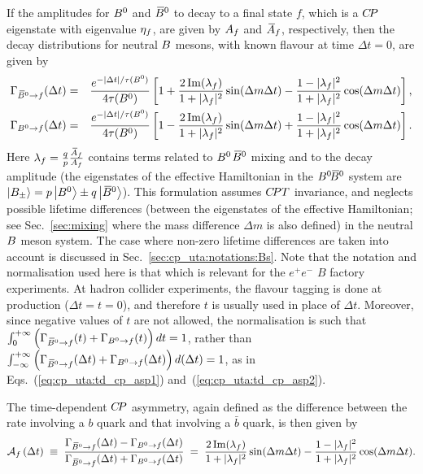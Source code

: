 If the amplitudes for $B^0$ and $\kern 0.18em\overline{\kern -0.18em B}{}^0$ to decay to a final state $f$, 
which is a $C\!P$ eigenstate with eigenvalue ${\eta_f}$,
are given by $A_f$ and $\kern 0.18em\overline{\kern -0.18em A}{}_f$, respectively, 
then the decay distributions for neutral $B$ mesons, 
with known flavour at time $\Delta t =0$,
are given by
\begin{eqnarray}
  \label{eq:cp_uta:td_cp_asp1}
  \Gamma_{\kern 0.18em\overline{\kern -0.18em B}{}^0 \to f} (\Delta t) & = &
  \frac{e^{-| \Delta t | / \tau(B^0)}}{4\tau(B^0)}
  \left[ 
    1 +
    \frac{2\, {\rm Im}(\lambda_f)}{1 + |\lambda_f|^2} \sin(\Delta m \Delta t) -
    \frac{1 - |\lambda_f|^2}{1 + |\lambda_f|^2} \cos(\Delta m \Delta t)
  \right], \\
  \label{eq:cp_uta:td_cp_asp2}
  \Gamma_{B^0 \to f} (\Delta t) & = &
  \frac{e^{-| \Delta t | / \tau(B^0)}}{4\tau(B^0)}
  \left[ 
    1 -
    \frac{2\, {\rm Im}(\lambda_f)}{1 + |\lambda_f|^2} \sin(\Delta m \Delta t) +
    \frac{1 - |\lambda_f|^2}{1 + |\lambda_f|^2} \cos(\Delta m \Delta t)
  \right].
\end{eqnarray}
Here $\lambda_f = \frac{q}{p} \frac{\kern 0.18em\overline{\kern -0.18em A}{}_f}{A_f}$ 
contains terms related to $B^0$\textendash$\kern 0.18em\overline{\kern -0.18em B}{}^0$ mixing and to the decay amplitude
(the eigenstates of the effective Hamiltonian in the $\BzBzb$ system 
are $\left| B_\pm \right> = p \left| B^0 \right> \pm q \left| \kern 0.18em\overline{\kern -0.18em B}{}^0 \right>$).
This formulation assumes $C\!PT$ invariance, 
and neglects possible lifetime differences 
(between the eigenstates of the effective Hamiltonian;
see Sec.~\ref{sec:mixing} where the mass difference $\Delta m$ is also defined)
in the neutral $B$ meson system.
The case where non-zero lifetime differences are taken into account is 
discussed in Sec.~\ref{sec:cp_uta:notations:Bs}.
Note that the notation and normalisation used here is that which is relevant for the $e^+e^-$ $B$ factory experiments.
At hadron collider experiments, the flavour tagging is done at production ($\Delta t = t = 0$), and therefore $t$ is usually used in place of $\Delta t$.
Moreover, since negative values of $t$ are not allowed, the normalisation is such that 
$\int_0^{+\infty} \left( 
\Gamma_{\kern 0.18em\overline{\kern -0.18em B}{}^0 \to f} (t) + \Gamma_{B^0 \to f} (t) \right) dt = 1$,
rather than 
$\int_{-\infty}^{+\infty} \left( 
\Gamma_{\kern 0.18em\overline{\kern -0.18em B}{}^0 \to f} (\Delta t) + \Gamma_{B^0 \to f} (\Delta t) \right) d(\Delta t) = 1$,
as in Eqs.~(\ref{eq:cp_uta:td_cp_asp1}) and~(\ref{eq:cp_uta:td_cp_asp2}).

The time-dependent $C\!P$ asymmetry,
again defined as the difference between the rate 
involving a $b$ quark and that involving a $\bar b$ quark,
is then given by
\begin{equation}
  \label{eq:cp_uta:td_cp_asp}
  {\cal A}_{f} \left(\Delta t\right) \; \equiv \;
  \frac{
    \Gamma_{\kern 0.18em\overline{\kern -0.18em B}{}^0 \to f} (\Delta t) - \Gamma_{B^0 \to f} (\Delta t)
  }{
    \Gamma_{\kern 0.18em\overline{\kern -0.18em B}{}^0 \to f} (\Delta t) + \Gamma_{B^0 \to f} (\Delta t)
  } \; = \;
  \frac{2\, {\rm Im}(\lambda_f)}{1 + |\lambda_f|^2} \sin(\Delta m \Delta t) -
  \frac{1 - |\lambda_f|^2}{1 + |\lambda_f|^2} \cos(\Delta m \Delta t).
\end{equation}

